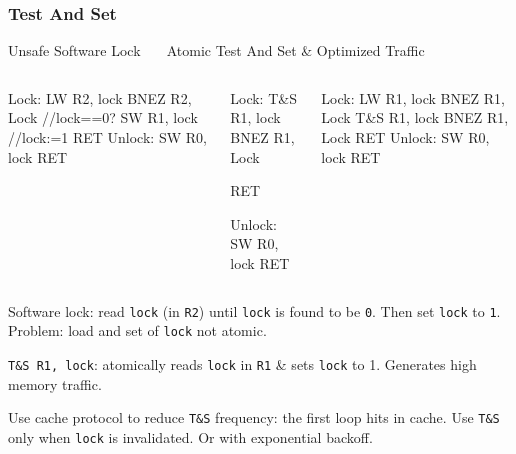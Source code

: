 \documentclass{beamer}
\renewcommand{\emph}[1]{\textcolor{structure}{#1}}
\newcommand{\emp}[1]{\textcolor{DikuRed}{ #1}}
\begin{document}
\begin{frame}[fragile,t]
\frametitle{Test And Set}

\begin{block}{Unsafe Software Lock{\tt~~~} Atomic Test And Set \& Optimized Traffic}
\begin{columns}
\begin{colorcode}[fontsize=\scriptsize]
Lock:   
  \alert{LW   R2, lock}
  BNEZ R2, Lock //lock==0?
  \alert{SW   R1, lock} //lock:=1
  RET
Unlock: SW   R0, lock
        RET
\end{colorcode} 
\pause
\begin{colorcode}[fontsize=\scriptsize]
Lock:   \emp{T\&S R1, lock}
        BNEZ R1, Lock

        RET

Unlock: SW   R0, lock
        RET
\end{colorcode} 
\pause
\begin{colorcode}[fontsize=\scriptsize]
Lock:   \emph{LW   R1, lock}
        \emph{BNEZ R1, Lock}
        \emph{T\&S R1, lock}
        BNEZ R1, Lock
        RET
Unlock: SW   R0, lock
        RET
\end{colorcode}   
\end{columns}
\end{block}

\alert{Software lock}: read {\tt lock} (in {\tt R2}) until {\tt lock} is found to be {\tt 0}.
    Then set {\tt lock} to {\tt 1}. \alert{Problem: load and set of {\tt lock} not atomic.}\medskip

\emp{\tt T\&S R1, lock}: atomically reads {\tt lock} in {\tt R1} \& sets {\tt lock} to 1. 
\emp{Generates high memory traffic.}\medskip

\emph{Use cache protocol to reduce {\tt T\&S} frequency:} the first loop hits in cache.
Use {\tt T\&S} only when {\tt lock} is invalidated. Or with exponential backoff.

\end{frame}
\end{document}

